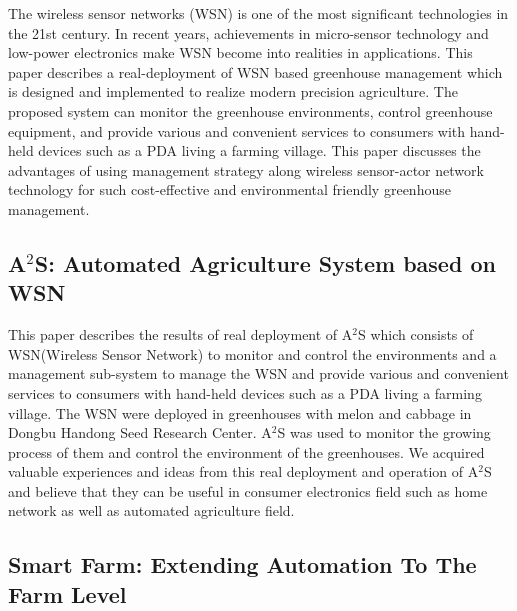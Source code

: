 \documentclass[10pt,a4paper]{article}
\begin{document}
\quad

The wireless sensor networks (WSN) is one of the most significant technologies in the 21st century. In recent years, achievements in micro-sensor technology and low-power electronics make WSN become into realities in applications. This paper describes a real-deployment of WSN based greenhouse management which is designed and implemented to realize modern precision agriculture. The proposed system can monitor the greenhouse environments, control greenhouse equipment, and provide various and convenient services to consumers with hand- held devices such as a PDA living a farming village. This paper discusses the advantages of using management strategy along wireless sensor-actor network technology for such cost-effective and environmental friendly greenhouse management. \cite{6}

\subsection{A\ensuremath{^2}S: Automated Agriculture System based on WSN}

\quad
This paper describes the results of real deployment of A\ensuremath{^2}S which consists of WSN(Wireless Sensor Network) to monitor and control the environments and a management sub-system to manage the WSN and provide various and convenient services to consumers with hand-held devices such as a PDA living a farming village. The WSN were deployed in greenhouses with melon and cabbage in Dongbu Handong Seed Research Center. A\ensuremath{^2}S was used to monitor the growing process of them and control the environment of the greenhouses. We acquired valuable experiences and ideas from this real deployment and operation of A\ensuremath{^2}S and believe that they can be useful in consumer electronics field such as home network as well as automated agriculture field. \cite{7}

\subsection{Smart Farm: Extending Automation To The Farm Level}
\end{document}
